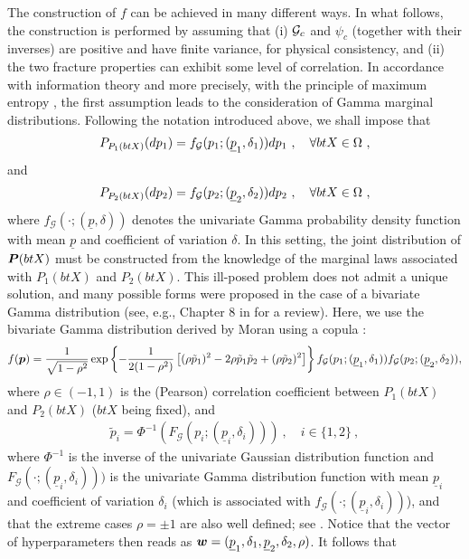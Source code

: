 The construction of $f$ can be achieved in many different ways. In what follows, the construction is performed by assuming that (i) ${\mathcal{G}_c}$ and $\psi_c$ (together with their inverses) are positive and have finite variance, for physical consistency, and (ii) the two fracture properties can exhibit some level of correlation. In accordance with information theory \cite{Jaynes1957a,Jaynes1957b} and more precisely, with the principle of maximum entropy \cite{Shannon1948a,Shannon1948b}, the first assumption leads to the consideration of Gamma marginal distributions. Following the notation introduced above, we shall impose that
\begin{align}
  P_{P_1(btX)}(dp_1) = f_\mathcal{G}(p_1; (\underline{p}_1,\delta_{1}))dp_1~, \quad \forall btX \in \Omega~,
\end{align}
and
\begin{align}
  P_{P_2(btX)}(dp_2) = f_\mathcal{G}(p_2; (\underline{p}_2,\delta_{2}))dp_2~, \quad \forall btX \in \Omega~,
\end{align}
where $f_\mathcal{G}(\cdot; (\underline{p}, \delta))$ denotes the univariate Gamma probability density function with mean $\underline{p}$ and coefficient of variation $\delta$. In this setting, the joint distribution of $\boldsymbol{P}(btX)$ must be constructed from the knowledge of the marginal laws associated with $P_1(btX)$ and $P_2(btX)$. This ill-posed problem does not admit a unique solution, and many possible forms were proposed in the case of a bivariate Gamma distribution (see, e.g., Chapter 8 in \cite{Balakrishnan2009} for a review). Here, we use the bivariate Gamma distribution derived by Moran using a copula \cite{Moran1969}:
\begin{align}
  f(\boldsymbol{p}) = \frac{1}{\sqrt{1-\rho^2}}\exp\left\{-\frac{1}{2(1-\rho^2)}\left[(\rho \tilde{p}_1)^2-2\rho \tilde{p}_1\tilde{p}_2+(\rho \tilde{p}_2)^2\right]\right\} f_\mathcal{G}(p_1; (\underline{p}_1,\delta_{1})) f_\mathcal{G}(p_2; (\underline{p}_2,\delta_{2})),
\end{align}
where $\rho \in (-1,1)$ is the (Pearson) correlation coefficient between $P_1(btX)$ and $P_2(btX)$ ($btX$ being fixed), and
\begin{align}
  \tilde{p}_i = \Phi^{-1}(F_\mathcal{G}(p_i; (\underline{p}_i,\delta_{i})))~, \quad i\in\{1,2\}~,
\end{align}
where $\Phi^{-1}$ is the inverse of the univariate Gaussian distribution function and $F_\mathcal{G}(\cdot; (\underline{p}_i,\delta_{i})))$ is the univariate Gamma distribution function with mean $\underline{p}_i$ and coefficient of variation $\delta_i$ (which is associated with $f_\mathcal{G}(\cdot; (\underline{p}_i, \delta_i))$), and that the extreme cases $\rho = \pm 1$ are also well defined; see \cite{Moran1969}. Notice that the vector of hyperparameters then reads as $\boldsymbol{w} = (\underline{p}_1,\delta_{1},\underline{p}_2,\delta_{2},\rho)$. It follows that
